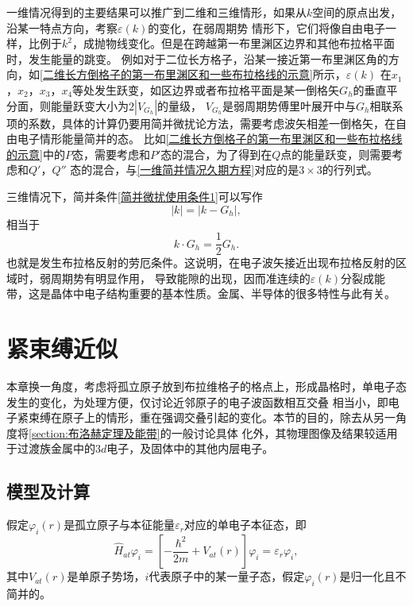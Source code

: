             一维情况得到的主要结果可以推广到二维和三维情形，如果从$k$空间的原点出发，沿某一特点方向，考察$\varepsilon(k)$的变化，在弱周期势
            情形下，它们将像自由电子一样，比例于$k^2$，成抛物线变化。但是在跨越第一布里渊区边界和其他布拉格平面时，发生能量的跳变。
            例如对于二位长方格子，沿某一接近第一布里渊区角的方向，如\autoref{二维长方倒格子的第一布里渊区和一些布拉格线的示意}所示，$\varepsilon(k)$
            在$x_1$，$x_2$，$x_3$，$x_4$等处发生跃变，如区边界或者布拉格平面是某一倒格矢$G_h$的垂直平分面，则能量跃变大小为$2|V_{G_h}|$的量级，
            $V_{G_h}$是弱周期势傅里叶展开中与$G_h$相联系项的系数，具体的计算仍要用简并微扰论方法，需要考虑波矢相差一倒格矢，在自由电子情形能量简并的态。
            比如\autoref{二维长方倒格子的第一布里渊区和一些布拉格线的示意}中的$P$态，需要考虑和$P'$态的混合，为了得到在$Q$点的能量跃变，则需要考虑和$Q'$，$Q''$
            态的混合，与\autoref{一维简并情况久期方程}对应的是$3\times3$的行列式。
            

            三维情况下，简并条件\autoref{简并微扰使用条件1}可以写作
            \begin{equation}
                |k|=|k-G_h|,
            \end{equation}
            相当于
            \begin{equation}
                k\cdot G_h=\frac{1}{2}G_h.
            \end{equation}
            也就是发生布拉格反射的劳厄条件。这说明，在电子波矢接近出现布拉格反射的区域时，弱周期势有明显作用，
            导致能隙的出现，因而准连续的$\varepsilon(k)$分裂成能带，这是晶体中电子结构重要的基本性质。金属、半导体的很多特性与此有关。

        \section{紧束缚近似}\label{section:紧束缚近似}
            
            本章换一角度，考虑将孤立原子放到布拉维格子的格点上，形成晶格时，单电子态发生的变化，为处理方便，仅讨论近邻原子的电子波函数相互交叠
            相当小，即电子紧束缚在原子上的情形，重在强调交叠引起的变化。本节的目的，除去从另一角度将\autoref{section:布洛赫定理及能带}的一般讨论具体
            化外，其物理图像及结果较适用于过渡族金属中的$3d$电子，及固体中的其他内层电子。

            \subsection{模型及计算}
                假定$\varphi_i(r)$是孤立原子与本征能量$\varepsilon_r$对应的单电子本征态，即
                \begin{equation}
                    \hat{H}_{at}\varphi_i=\left[ - \frac{\hbar^2}{2m} +V_{at}(r) \right]\varphi_i=\varepsilon_r\varphi_i,
                \end{equation}                
                其中$V_{at}(r)$是单原子势场，$i$代表原子中的某一量子态，假定$\varphi_i(r)$是归一化且不简并的。

